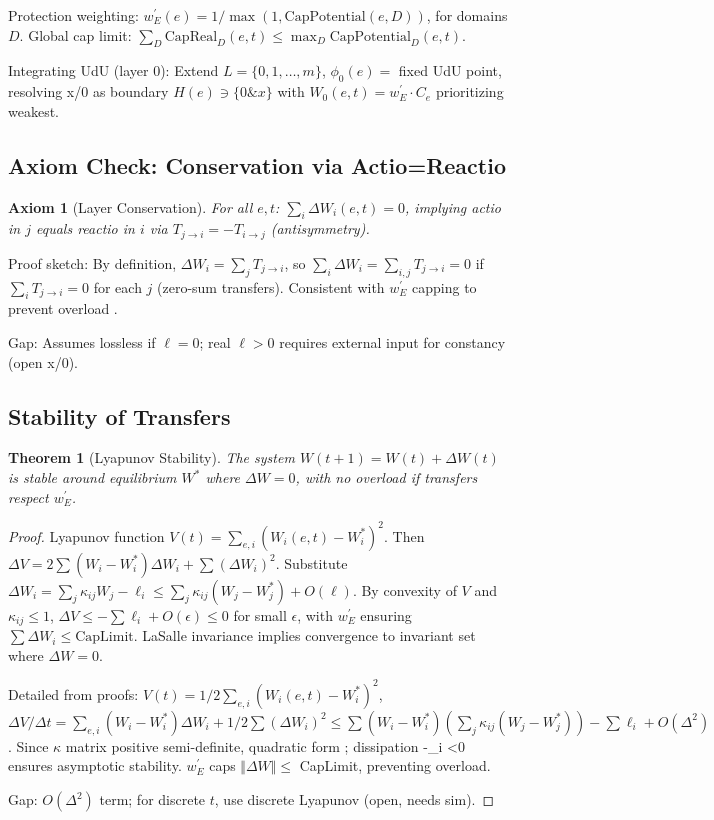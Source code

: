 \documentclass{article}
\newtheorem{theorem}{Theorem}[section]
\newtheorem{axiom}{Axiom}[section]
\newtheorem{proof}{Proof}[section]
\begin{document}
Protection weighting: $w_E^\prime(e) = 1 / \max(1, \mathrm{CapPotential}(e, D))$, for domains $D$. Global cap limit: $\sum_D \mathrm{CapReal}_D(e, t) \leq \max_D \mathrm{CapPotential}_D(e, t)$.

Integrating UdU (layer 0): Extend $L = \{0, 1, \dots, m\}$, $\phi_0(e) =$ fixed UdU point, resolving x/0 as boundary $H(e) \ni \{0 \& x\}$ with $W_0(e, t) = w_E^\prime \cdot C_e$ prioritizing weakest.

\subsection{Axiom Check: Conservation via Actio=Reactio}

\begin{axiom}[Layer Conservation]\label{ax:conservation}
For all $e, t$: $\sum_i \Delta W_i(e, t) = 0$, implying actio in $j$ equals reactio in $i$ via $T_{j \to i} = -T_{i \to j}$ (antisymmetry).
\end{axiom}

Proof sketch: By definition, $\Delta W_i = \sum_j T_{j \to i}$, so $\sum_i \Delta W_i = \sum_{i,j} T_{j \to i} = 0$ if $\sum_i T_{j \to i} = 0$ for each $j$ (zero-sum transfers). Consistent with $w_E^\prime$ capping to prevent overload \cite{analysis_2025}.

Gap: Assumes lossless if $\ell=0$; real $\ell > 0$ requires external input for constancy (open x/0).

\subsection{Stability of Transfers}

\begin{theorem}[Lyapunov Stability]\label{thm:stability}
The system $W(t+1) = W(t) + \Delta W(t)$ is stable around equilibrium $W^*$ where $\Delta W = 0$, with no overload if transfers respect $w_E^\prime$.
\end{theorem}

\begin{proof}
Lyapunov function $V(t) = \sum_{e,i} (W_i(e,t) - W_i^*)^2$. Then
$\Delta V = 2 \sum (W_i - W_i^*) \Delta W_i + \sum (\Delta W_i)^2$.
Substitute $\Delta W_i = \sum_j \kappa_{ij} W_j - \ell_i \leq \sum_j \kappa_{ij} (W_j - W_j^*) + O(\ell)$.
By convexity of $V$ and $\kappa_{ij} \leq 1$, $\Delta V \leq -\sum \ell_i + O(\epsilon) \leq 0$ for small $\epsilon$, with $w_E^\prime$ ensuring $\sum \Delta W_i \leq \mathrm{CapLimit}$. LaSalle invariance implies convergence to invariant set where $\Delta W=0$.

Detailed from proofs: $V(t) = 1/2 \sum_{e,i} (W_i(e,t) - W_i^*)^2$, $\Delta V / \Delta t = \sum_{e,i} (W_i - W_i^*) \Delta W_i + 1/2 \sum (\Delta W_i)^2 \leq \sum (W_i - W_i^*) (\sum_j \kappa_{ij} (W_j - W_j^*)) - \sum \ell_i + O(\Delta^2)$. Since $\kappa$ matrix positive semi-definite, quadratic form ; dissipation -\sum \ell_i <0 ensures asymptotic stability. $w_E^\prime$ caps $\Vert \Delta W \Vert \leq$ CapLimit, preventing overload.

Gap: $O(\Delta^2)$ term; for discrete $t$, use discrete Lyapunov (open, needs sim).
\end{proof}
\end{document}

